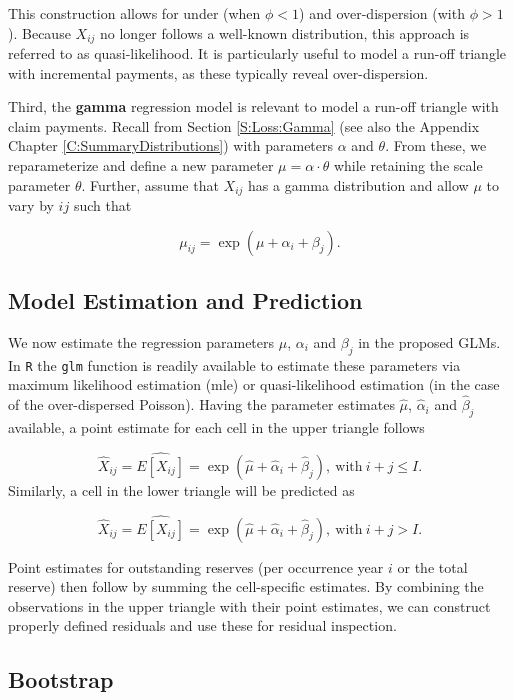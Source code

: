 \documentclass[]{book}
\begin{document}
This construction allows for under (when \(\phi <1\)) and
over-dispersion (with \(\phi>1\)). Because \(X_{ij}\) no longer follows
a well-known distribution, this approach is referred to as
quasi-likelihood. It is particularly useful to model a run-off triangle
with incremental payments, as these typically reveal over-dispersion.

Third, the \textbf{gamma} regression model is relevant to model a
run-off triangle with claim payments. Recall from Section
\ref{S:Loss:Gamma} (see also the Appendix Chapter
\ref{C:SummaryDistributions}) with parameters \(\alpha\) and \(\theta\).
From these, we reparameterize and define a new parameter
\(\mu = \alpha \cdot \theta\) while retaining the scale parameter
\(\theta\). Further, assume that \(X_{ij}\) has a gamma distribution and
allow \(\mu\) to vary by \(ij\) such that

\[
\mu_{ij} =  \exp{(\mu + \alpha_i + \beta_j)}.
\]

\subsection{Model Estimation and
Prediction}\label{model-estimation-and-prediction}

We now estimate the regression parameters \(\mu\), \(\alpha_i\) and
\(\beta_j\) in the proposed GLMs. In \texttt{R} the \texttt{glm}
function is readily available to estimate these parameters via maximum
likelihood estimation (mle) or quasi-likelihood estimation (in the case
of the over-dispersed Poisson). Having the parameter estimates
\(\hat{\mu}\), \(\hat{\alpha}_i\) and \(\hat{\beta}_j\) available, a
point estimate for each cell in the upper triangle follows

\[
\hat{X}_{ij} =\hat{E[X_{ij}]} = \exp{(\hat{\mu}+\hat{\alpha}_i+\hat{\beta}_j)},\ \text{with}\ i+j\leq I.
\] Similarly, a cell in the lower triangle will be predicted as

\[
\hat{X}_{ij} = \hat{E[X_{ij}]} = \exp{(\hat{\mu}+\hat{\alpha}_i+\hat{\beta}_j)},\ \text{with}\ i+j> I.
\]

Point estimates for outstanding reserves (per occurrence year \(i\) or
the total reserve) then follow by summing the cell-specific estimates.
By combining the observations in the upper triangle with their point
estimates, we can construct properly defined residuals and use these for
residual inspection.

\subsection{Bootstrap}\label{bootstrap}
\end{document}
